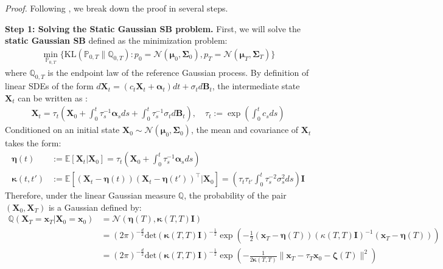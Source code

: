 \documentclass{article}
\begin{document}
\textit{Proof.} Following \citet{bunne2023schrodinger}, we break down the proof in several steps. 

\textbf{Step 1: Solving the Static Gaussian SB problem.} 
First, we will solve the \textbf{static Gaussian SB} defined as the minimization problem:
\begin{align}
    \min_{\mathbb{P}_{0,T}}\bigg\{\text{KL}(\mathbb{P}_{0,T}\|\mathbb{Q}_{0,T}):p_0=\mathcal{N}(\boldsymbol{\mu}_0, \boldsymbol{\Sigma}_0), p_T=\mathcal{N}(\boldsymbol{\mu}_T, \boldsymbol{\Sigma}_T)\bigg\}
\end{align}
where $\mathbb{Q}_{0,T}$ is the endpoint law of the reference Gaussian process. By definition of linear SDEs of the form $d\boldsymbol{X}_t=(c_t\boldsymbol{X}_t+\boldsymbol{\alpha}_t)dt+\sigma_td\boldsymbol{B}_t$, the intermediate state $\boldsymbol{X}_t$ can be written as \citep{platen2010numerical}:
\begin{align}
    \boldsymbol{X}_t=\tau_t\left(\boldsymbol{X}_0+\int_0^t\tau_s^{-1}\boldsymbol{\alpha}_sds+\int_0^t\tau_s^{-1}\sigma_td\boldsymbol{B}_t\right), \quad \tau_t:=\exp\left(\int_0^tc_sds\right)\label{eq:linear-sde-sol}
\end{align}
Conditioned on an initial state $\boldsymbol{X}_0\sim \mathcal{N}(\boldsymbol{\mu}_0, \boldsymbol{\Sigma}_0)$, the mean and covariance of $\boldsymbol{X}_t$ takes the form:
\begin{align}
    \boldsymbol{\eta}(t)&:=\mathbb{E}[\boldsymbol{X}_t|\boldsymbol{X}_0]=\tau_t\left(\boldsymbol{X}_0+\int_0^t\tau_s^{-1}\boldsymbol{\alpha}_sds\right)\label{eq:guassian-sde-mean}\\
    \boldsymbol{\kappa}(t, t')&:=\mathbb{E}\left[(\boldsymbol{X}_t-\boldsymbol{\eta}(t))(\boldsymbol{X}_t-\boldsymbol{\eta}(t'))^{\top}\big|\boldsymbol{X}_0\right]= \left(\tau_t\tau_{t'}\int_0^t\tau_s^{-2}\sigma_s^2ds\right)\boldsymbol{I}\label{eq:guassian-sde-cov}
\end{align}
Therefore, under the linear Gaussian measure $\mathbb{Q}$, the probability of the pair $(\boldsymbol{X}_0, \boldsymbol{X}_T)$ is a Gaussian defined by:
\begin{align}
    \mathbb{Q}(\boldsymbol{X}_T=\boldsymbol{x}_T|\boldsymbol{X}_0=\boldsymbol{x}_0)&=\mathcal{N}(\boldsymbol{\eta}(T), \boldsymbol{\kappa}(T,T)\boldsymbol{I})\nonumber\\
    &=(2\pi)^{-\frac{d}{2}}\text{det}(\boldsymbol{\kappa}(T,T)\boldsymbol{I})^{-\frac{1}{2}}\exp\left(-\frac{1}{2}(\boldsymbol{x}_T-\boldsymbol{\eta}(T))(\kappa(T,T)\boldsymbol{I})^{-1}(\boldsymbol{x}_T-\boldsymbol{\eta}(T))\right)\nonumber\\
    &=(2\pi)^{-\frac{d}{2}}\text{det}(\boldsymbol{\kappa}(T,T)\boldsymbol{I})^{-\frac{1}{2}}\exp\left(-\frac{1}{2\boldsymbol{\kappa}(T,T)}\|\boldsymbol{x}_T-\tau_T\boldsymbol{x}_0-\boldsymbol{\zeta}(T)\|^2\right)\label{eq:q-coupling}
\end{align}
\end{document}
